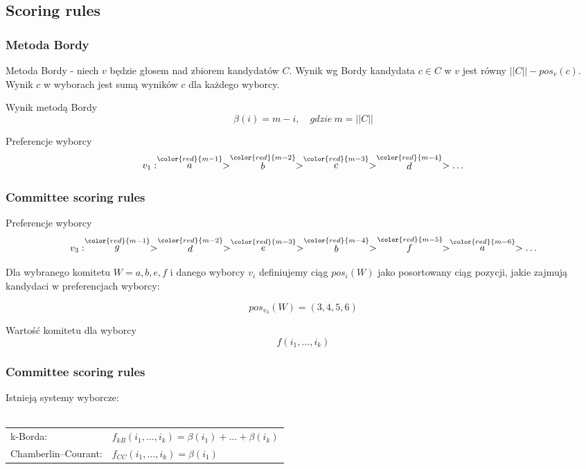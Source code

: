 \documentclass{beamer}
\newcommand{\red}[1]{
	{ \color{red}{#1} }
}
\newcommand{\score}[2]{
	\stackrel
	{\red{#1}}
	{#2}
}
\begin{document}
\subsection{Scoring rules}

\begin{frame}
\frametitle{Metoda Bordy}

Metoda Bordy -
niech $v$ będzie głosem nad zbiorem kandydatów $C$.
Wynik wg Bordy kandydata $c \in C$ w $v$ jest równy
$ ||C|| - pos_v(c) $.
Wynik $c$ w wyborach jest sumą wyników $c$ dla każdego wyborcy.

\begin{exampleblock}{Wynik metodą Bordy}
$$
\beta(i) = m-i, \quad gdzie \ m = ||C||
$$
\end{exampleblock}

\begin{exampleblock}{Preferencje wyborcy}
$$ 
v_1: \score{m-1}{a} > \score{m-2}{b} > \score{m-3}{c} > \score{m-4}{d} > \ldots
$$
\end{exampleblock}

\end{frame}


\begin{frame}
\frametitle{Committee scoring rules}

\begin{exampleblock}{Preferencje wyborcy}
$$
v_3: \score{m-1}{g} > \score{m-2}{d} > \score{m-3}{e} > \score{m-4}{b} > \score{m-5}{f} > \score{m-6}{a} > \ldots
$$
\end{exampleblock}

Dla wybranego komitetu $W = {a, b, e, f}$ i danego
wyborcy $v_i$ definiujemy ciąg $ pos_i(W) $ jako
posortowany ciąg pozycji, jakie zajmują kandydaci w preferencjach wyborcy:

$$pos_{v_3}(W) = (3, 4, 5, 6)$$

\begin{exampleblock}{Wartość komitetu dla wyborcy}
$$
f(i_1, \ldots, i_k)
$$
\end{exampleblock}

\end{frame}


\begin{frame}
\frametitle{Committee scoring rules}

Istnieją systemy wyborcze: \\ ~ \\

\begin{tabular}{ll}
k-Borda: 			& $f_{kB}(i_1, \ldots, i_k) = \beta(i_1) + \ldots + \beta(i_k)$\\
Chamberlin–Courant:  & $f_{CC}(i_1, \ldots, i_k) = \beta(i_1)$
\end{tabular}

\end{frame}
\end{document}
